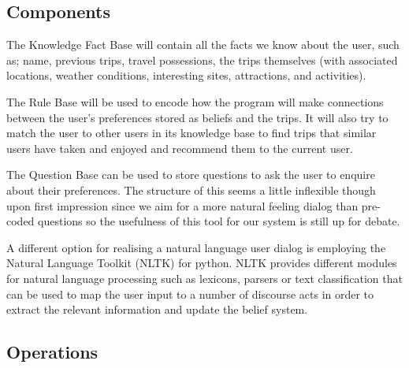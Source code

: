\documentclass[11pt]{article} %
\begin{document}
\subsection{Components}

The Knowledge Fact Base will contain all the facts we
know about the user, such as; name, previous trips, travel
possessions, the trips themselves (with associated
locations, weather conditions, interesting sites,
attractions, and activities).

The Rule Base will be used to encode how the program
will make connections between the user’s preferences
stored as beliefs and the trips. It will also try to match
the user to other users in its knowledge base to find
trips that similar users have taken and enjoyed and
recommend them to the current user.

The Question Base can be used to store questions to ask
the user to enquire about their preferences. The
structure of this seems a little inflexible though
upon first impression since we aim for a more natural
feeling dialog than pre-coded questions so the usefulness
of this tool for our system is still up for debate.

A different option for realising a natural language
user dialog is employing the Natural Language Toolkit
(NLTK) for python. NLTK provides different modules
for natural language processing such as lexicons,
parsers or text classification that can be used to
map the user input to a number of discourse acts in
order to extract the relevant information and update
the belief system.

\subsection{Operations}
\end{document}
